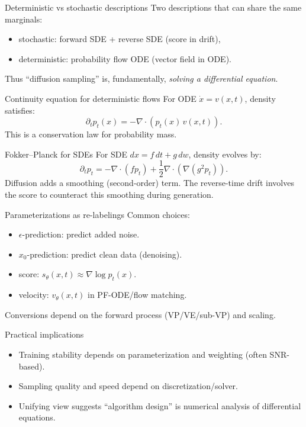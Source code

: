 \documentclass[aspectratio=169]{beamer}
\begin{document}
\begin{frame}{Deterministic vs stochastic descriptions}
Two descriptions that can share the same marginals:
\begin{itemize}
\item stochastic: forward SDE + reverse SDE (score in drift),
\item deterministic: probability flow ODE (vector field in ODE).
\end{itemize}
Thus ``diffusion sampling'' is, fundamentally, \emph{solving a differential equation}.
\end{frame}

\begin{frame}{Continuity equation for deterministic flows}
For ODE \( \dot x = v(x,t)\), density satisfies:
\[
\partial_t p_t(x) = -\nabla\cdot(p_t(x)\,v(x,t)).
\]
This is a conservation law for probability mass.
\end{frame}

\begin{frame}{Fokker--Planck for SDEs}
For SDE \(dx=f\,dt+g\,dw\), density evolves by:
\[
\partial_t p_t = -\nabla\cdot(f p_t) + \frac12 \nabla\cdot(\nabla(g^2 p_t)).
\]
Diffusion adds a smoothing (second-order) term.
The reverse-time drift involves the score to counteract this smoothing during generation.
\end{frame}

\begin{frame}{Parameterizations as re-labelings}
Common choices:
\begin{itemize}
\item \(\epsilon\)-prediction: predict added noise.
\item \(x_0\)-prediction: predict clean data (denoising).
\item score: \(s_\theta(x,t)\approx \nabla\log p_t(x)\).
\item velocity: \(v_\theta(x,t)\) in PF-ODE/flow matching.
\end{itemize}
Conversions depend on the forward process (VP/VE/sub-VP) and scaling.
\end{frame}

\begin{frame}{Practical implications}
\begin{itemize}
\item Training stability depends on parameterization and weighting (often SNR-based).
\item Sampling quality and speed depend on discretization/solver.
\item Unifying view suggests ``algorithm design'' is numerical analysis of differential equations.
\end{itemize}
\end{frame}
\end{document}
